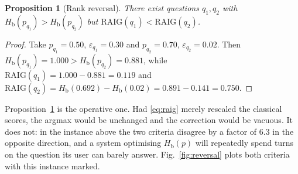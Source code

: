 \documentclass[conference]{IEEEtran}
\newcommand{\Hb}{H_{\mathrm{b}}}
\newcommand{\RAIG}{\mathrm{RAIG}}
\newtheorem{proposition}{Proposition}
\begin{document}
\begin{proposition}[Rank reversal]
\label{prop:reversal}
There exist questions $q_1,q_2$ with $\Hb(p_{q_1}) > \Hb(p_{q_2})$ but
$\RAIG(q_1) < \RAIG(q_2)$.
\end{proposition}

\begin{proof}
Take $p_{q_1}=0.50$, $\varepsilon_{q_1}=0.30$ and $p_{q_2}=0.70$,
$\varepsilon_{q_2}=0.02$. Then $\Hb(p_{q_1})=1.000 > \Hb(p_{q_2})=0.881$, while
$\RAIG(q_1)=1.000-0.881=0.119$ and
$\RAIG(q_2)=\Hb(0.692)-\Hb(0.02)=0.891-0.141=0.750$.
\end{proof}

Proposition~\ref{prop:reversal} is the operative one. Had \eqref{eq:raig}
merely rescaled the classical scores, the argmax would be unchanged and the
correction would be vacuous. It does not: in the instance above the two
criteria disagree by a factor of $6.3$ in the opposite direction, and a system
optimising $\Hb(p)$ will repeatedly spend turns on the question its user can
barely answer. Fig.~\ref{fig:reversal} plots both criteria with this instance
marked.
\end{document}
